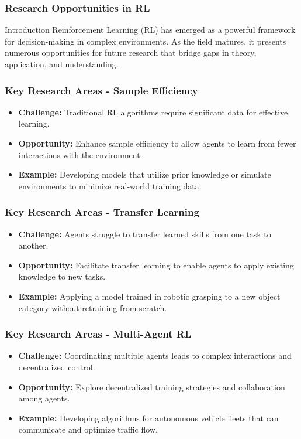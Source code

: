 \documentclass[aspectratio=169]{beamer}
\begin{document}
\begin{frame}[fragile]
    \frametitle{Research Opportunities in RL}
    \begin{block}{Introduction}
        Reinforcement Learning (RL) has emerged as a powerful framework for decision-making in complex environments. As the field matures, it presents numerous opportunities for future research that bridge gaps in theory, application, and understanding.
    \end{block}
\end{frame}

\begin{frame}[fragile]
    \frametitle{Key Research Areas - Sample Efficiency}
    \begin{itemize}
        \item \textbf{Challenge:} Traditional RL algorithms require significant data for effective learning.
        \item \textbf{Opportunity:} Enhance sample efficiency to allow agents to learn from fewer interactions with the environment.
        \item \textbf{Example:} Developing models that utilize prior knowledge or simulate environments to minimize real-world training data.
    \end{itemize}
\end{frame}

\begin{frame}[fragile]
    \frametitle{Key Research Areas - Transfer Learning}
    \begin{itemize}
        \item \textbf{Challenge:} Agents struggle to transfer learned skills from one task to another.
        \item \textbf{Opportunity:} Facilitate transfer learning to enable agents to apply existing knowledge to new tasks.
        \item \textbf{Example:} Applying a model trained in robotic grasping to a new object category without retraining from scratch.
    \end{itemize}
\end{frame}

\begin{frame}[fragile]
    \frametitle{Key Research Areas - Multi-Agent RL}
    \begin{itemize}
        \item \textbf{Challenge:} Coordinating multiple agents leads to complex interactions and decentralized control.
        \item \textbf{Opportunity:} Explore decentralized training strategies and collaboration among agents.
        \item \textbf{Example:} Developing algorithms for autonomous vehicle fleets that can communicate and optimize traffic flow.
    \end{itemize}
\end{frame}
\end{document}

